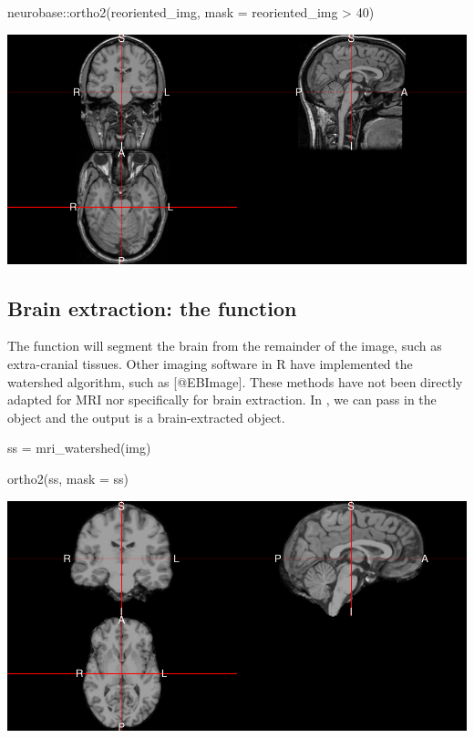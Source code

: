 \begin{Schunk}
\begin{Sinput}
neurobase::ortho2(reoriented_img, mask = reoriented_img > 40)
\end{Sinput}

\includegraphics{Freesurfer_files/figure-latex/mri_plot2-1} \end{Schunk}

\subsection{\texorpdfstring{Brain extraction: the 
function}{Brain extraction: the  function}}\label{brain-extraction-the-function}

The  function will segment the brain from the
remainder of the image, such as extra-cranial tissues. Other imaging
software in R have implemented the watershed algorithm, such as
 {[}@EBImage{]}. These methods have not been directly
adapted for MRI nor specifically for brain extraction. In
, we can pass in the  object and the output
is a brain-extracted  object.

\begin{Schunk}
\begin{Sinput}
ss = mri_watershed(img)
\end{Sinput}
\end{Schunk}

\begin{Schunk}
\begin{Sinput}
ortho2(ss, mask = ss)
\end{Sinput}
\end{Schunk}\begin{Schunk}

\includegraphics{Freesurfer_files/figure-latex/watershed_plot-1} \end{Schunk}

